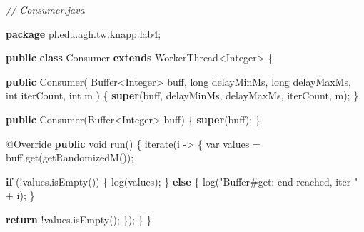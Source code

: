 \documentclass[11pt]{article}
\newenvironment{Shaded}{}{}
\newcommand{\KeywordTok}[1]{\textcolor[rgb]{0.00,0.44,0.13}{\textbf{{#1}}}}
\newcommand{\DataTypeTok}[1]{\textcolor[rgb]{0.56,0.13,0.00}{{#1}}}
\newcommand{\StringTok}[1]{\textcolor[rgb]{0.25,0.44,0.63}{{#1}}}
\newcommand{\CommentTok}[1]{\textcolor[rgb]{0.38,0.63,0.69}{\textit{{#1}}}}
\newcommand{\FunctionTok}[1]{\textcolor[rgb]{0.02,0.16,0.49}{{#1}}}
\newcommand{\NormalTok}[1]{{#1}}
\newcommand{\ImportTok}[1]{{#1}}
\newcommand{\ControlFlowTok}[1]{\textcolor[rgb]{0.00,0.44,0.13}{\textbf{{#1}}}}
\newcommand{\OperatorTok}[1]{\textcolor[rgb]{0.40,0.40,0.40}{{#1}}}
\newcommand{\BuiltInTok}[1]{{#1}}
\newcommand{\AttributeTok}[1]{\textcolor[rgb]{0.49,0.56,0.16}{{#1}}}
\begin{document}
\begin{Shaded}
\begin{Highlighting}[]
\CommentTok{// Consumer.java}

\KeywordTok{package}\ImportTok{ pl}\OperatorTok{.}\ImportTok{edu}\OperatorTok{.}\ImportTok{agh}\OperatorTok{.}\ImportTok{tw}\OperatorTok{.}\ImportTok{knapp}\OperatorTok{.}\ImportTok{lab4}\OperatorTok{;}

\KeywordTok{public} \KeywordTok{class}\NormalTok{ Consumer }\KeywordTok{extends}\NormalTok{ WorkerThread}\OperatorTok{\textless{}}\BuiltInTok{Integer}\OperatorTok{\textgreater{}} \OperatorTok{\{}

    \KeywordTok{public} \FunctionTok{Consumer}\OperatorTok{(}
            \BuiltInTok{Buffer}\OperatorTok{\textless{}}\BuiltInTok{Integer}\OperatorTok{\textgreater{}}\NormalTok{ buff}\OperatorTok{,}
            \DataTypeTok{long}\NormalTok{ delayMinMs}\OperatorTok{,} \DataTypeTok{long}\NormalTok{ delayMaxMs}\OperatorTok{,}
            \DataTypeTok{int}\NormalTok{ iterCount}\OperatorTok{,} \DataTypeTok{int}\NormalTok{ m}
    \OperatorTok{)} \OperatorTok{\{}
        \KeywordTok{super}\OperatorTok{(}\NormalTok{buff}\OperatorTok{,}\NormalTok{ delayMinMs}\OperatorTok{,}\NormalTok{ delayMaxMs}\OperatorTok{,}\NormalTok{ iterCount}\OperatorTok{,}\NormalTok{ m}\OperatorTok{);}
    \OperatorTok{\}}

    \KeywordTok{public} \FunctionTok{Consumer}\OperatorTok{(}\BuiltInTok{Buffer}\OperatorTok{\textless{}}\BuiltInTok{Integer}\OperatorTok{\textgreater{}}\NormalTok{ buff}\OperatorTok{)} \OperatorTok{\{}
        \KeywordTok{super}\OperatorTok{(}\NormalTok{buff}\OperatorTok{);}
    \OperatorTok{\}}

    \AttributeTok{@Override}
    \KeywordTok{public} \DataTypeTok{void} \FunctionTok{run}\OperatorTok{()} \OperatorTok{\{}
        \FunctionTok{iterate}\OperatorTok{(}\NormalTok{i }\OperatorTok{{-}\textgreater{}} \OperatorTok{\{}
            \DataTypeTok{var}\NormalTok{ values }\OperatorTok{=}\NormalTok{ buff}\OperatorTok{.}\FunctionTok{get}\OperatorTok{(}\FunctionTok{getRandomizedM}\OperatorTok{());}

            \ControlFlowTok{if} \OperatorTok{(!}\NormalTok{values}\OperatorTok{.}\FunctionTok{isEmpty}\OperatorTok{())} \OperatorTok{\{}
                \FunctionTok{log}\OperatorTok{(}\NormalTok{values}\OperatorTok{);}
            \OperatorTok{\}} \ControlFlowTok{else} \OperatorTok{\{}
                \FunctionTok{log}\OperatorTok{(}\StringTok{"Buffer\#get: end reached, iter "} \OperatorTok{+}\NormalTok{ i}\OperatorTok{);}
            \OperatorTok{\}}

            \ControlFlowTok{return} \OperatorTok{!}\NormalTok{values}\OperatorTok{.}\FunctionTok{isEmpty}\OperatorTok{();}
        \OperatorTok{\});}
    \OperatorTok{\}}
\OperatorTok{\}}
\end{Highlighting}
\end{Shaded}
\end{document}
